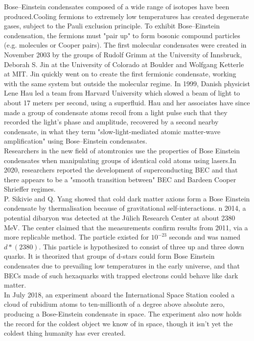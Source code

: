 \documentclass[12pt, letterpaper]{article}
\begin{document}
    Bose–Einstein condensates composed of a wide range of isotopes have been produced.Cooling fermions to extremely low 
    temperatures has created degenerate gases, subject to the Pauli exclusion principle. To exhibit Bose–Einstein condensation, 
    the fermions must "pair up" to form bosonic compound particles (e.g. molecules or Cooper pairs). The first molecular condensates 
    were created in November 2003 by the groups of Rudolf Grimm at the University of Innsbruck, Deborah S. Jin at the University of
    Colorado at Boulder and Wolfgang Ketterle at MIT. Jin quickly went on to create the first fermionic condensate, working with the
    same system but outside the molecular regime.
    In 1999, Danish physicist Lene Hau led a team from Harvard University which slowed a beam of light to about 17 meters per second,
    using a superfluid. Hau and her associates have since made a group of condensate atoms recoil from a light pulse such that 
    they recorded the light's phase and amplitude, recovered by a second nearby condensate, in what they term "slow-light-mediated 
    atomic matter-wave amplification" using Bose–Einstein condensates. \\ 
    
    Researchers in the new field of atomtronics use the properties of 
    Bose Einstein condensates when manipulating groups of identical cold atoms using lasers.In 2020, researchers reported 
    the development of superconducting BEC and that there appears to be a "smooth transition between" BEC and 
    Bardeen Cooper Shrieffer regimes. \\
    
    P. Sikivie and Q. Yang showed that cold dark matter axions form a Bose Einstein condensate by thermalisation because 
    of gravitational self-interactions. n 2014, a potential dibaryon was detected at the Jülich Research Center at about
    2380 MeV. The center claimed that the measurements confirm results from 2011, via a more replicable method. The 
    particle existed for $10^{-23}$ seconds and was named $d*(2380)$. This particle is hypothesized to consist of three up and 
    three down quarks. It is theorized that groups of d-stars could form Bose Einstein condensates due to prevailing 
    low temperatures in the early universe, and that BECs made of such hexaquarks with trapped electrons could behave 
    like dark matter. \\ 

    In July 2018, an experiment aboard the International Space Station cooled a cloud of rubidium atoms to ten-millionth of
    a degree above absolute zero, producing a Bose-Einstein condensate in space. The experiment also now holds the record 
    for the coldest object we know of in space, though it isn't yet the coldest thing humanity has ever created. \\ 
\end{document}
